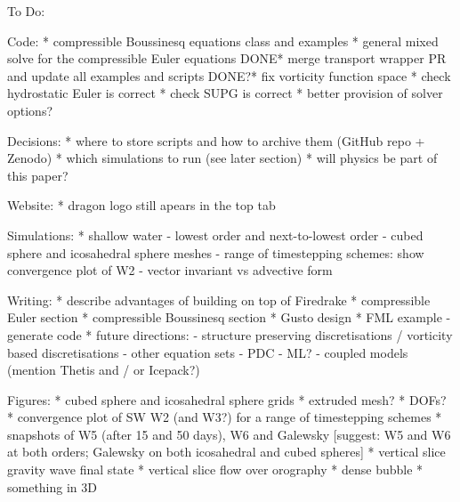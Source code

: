 To Do:

Code:
* compressible Boussinesq equations class and examples
* general mixed solve for the compressible Euler equations
DONE* merge transport wrapper PR and update all examples and scripts
DONE?* fix vorticity function space
* check hydrostatic Euler is correct
* check SUPG is correct
* better provision of solver options?

Decisions:
* where to store scripts and how to archive them (GitHub repo + Zenodo)
* which simulations to run (see later section)
* will physics be part of this paper?

Website:
* dragon logo still apears in the top tab

Simulations:
* shallow water
 - lowest order and next-to-lowest order
 - cubed sphere and icosahedral sphere meshes
 - range of timestepping schemes: show convergence plot of W2
 - vector invariant vs advective form


Writing:
* describe advantages of building on top of Firedrake
* compressible Euler section
* compressible Boussinesq section
* Gusto design
* FML example
 - generate code
* future directions:
 - structure preserving discretisations / vorticity based discretisations
 - other equation sets
 - PDC
 - ML?
 - coupled models (mention Thetis and / or Icepack?)

Figures:
* cubed sphere and icosahedral sphere grids
* extruded mesh?
* DOFs?
* convergence plot of SW W2 (and W3?) for a range of timestepping schemes
* snapshots of W5 (after 15 and 50 days), W6 and Galewsky [suggest: W5 and W6 at both orders; Galewsky on both icosahedral and cubed spheres]
* vertical slice gravity wave final state
* vertical slice flow over orography
* dense bubble
* something in 3D
